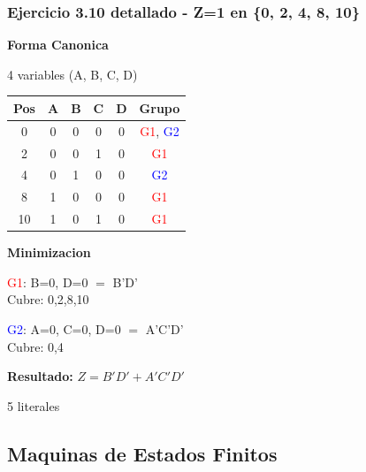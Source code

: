 \documentclass[12pt,a4paper]{article}
\begin{document}
\subsubsection{Ejercicio 3.10 detallado - Z=1 en \{0, 2, 4, 8, 10\}}

\vspace{0.3cm}

\begin{minipage}[t]{0.58\textwidth}
\textbf{Forma Canonica}

4 variables (A, B, C, D)

\begin{tabular}{|c|c|c|c|c|c|}
\hline
Pos & A & B & C & D & Grupo \\
\hline
0  & 0 & 0 & 0 & 0 & \textcolor{red}{G1}, \textcolor{blue}{G2} \\
2  & 0 & 0 & 1 & 0 & \textcolor{red}{G1} \\
4  & 0 & 1 & 0 & 0 & \textcolor{blue}{G2} \\
8  & 1 & 0 & 0 & 0 & \textcolor{red}{G1} \\
10 & 1 & 0 & 1 & 0 & \textcolor{red}{G1} \\
\hline
\end{tabular}
\end{minipage}
\hspace{0.3cm}
\begin{minipage}[t]{0.38\textwidth}
\textbf{Minimizacion}

\vspace{0.2cm}
\textcolor{red}{G1}: B=0, D=0 $=$ B'D' \\ Cubre: 0,2,8,10

\vspace{0.2cm}
\textcolor{blue}{G2}: A=0, C=0, D=0 $=$ A'C'D' \\ Cubre: 0,4

\vspace{0.3cm}
\textbf{Resultado:} $Z = B'D' + A'C'D'$

5 literales
\end{minipage}

\vspace{0.3cm}

\subsection{Maquinas de Estados Finitos}
\end{document}
